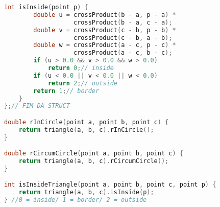\begin{lstlisting}[language=C++, title=Parte II de II]
	int isInside(point p) {
		double u = crossProduct(b - a, p - a) * 
		           crossProduct(b - a, c - a);
		double v = crossProduct(c - b, p - b) * 
		           crossProduct(c - b, a - b);
		double w = crossProduct(a - c, p - c) * 
		           crossProduct(a - c, b - c);
		if (u > 0.0 && v > 0.0 && w > 0.0)
			return 0;// inside
		if (u < 0.0 || v < 0.0 || w < 0.0)
			return 2;// outside
		return 1;// border
	}
};// FIM DA STRUCT

double rInCircle(point a, point b, point c) {
	return triangle(a, b, c).rInCircle();
}

double rCircumCircle(point a, point b, point c) {
	return triangle(a, b, c).rCircumCircle();
}

int isInsideTriangle(point a, point b, point c, point p) {
	return triangle(a, b, c).isInside(p);
} //0 = inside/ 1 = border/ 2 = outside
\end{lstlisting}